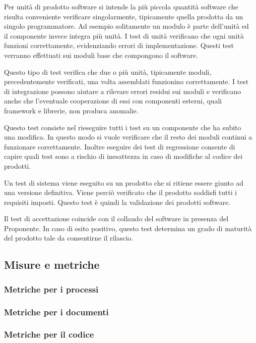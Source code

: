 Per unità di prodotto software si intende la più piccola quantità software che risulta conveniente verificare singolarmente, tipicamente quella prodotta da un singolo programmatore. Ad esempio solitamente un modulo è parte dell’unità ed il componente invece integra più unità. I test di unità verificano che ogni unità funzioni correttamente, evidenziando errori di implementazione. Questi test verranno effettuati sui moduli base che compongono il software.

Questo tipo di test verifica che due o più unità, tipicamente moduli, precedentemente verificati, una volta assemblati funzionino correttamente. I test di integrazione possono aiutare a rilevare errori residui sui moduli e verificano anche che l’eventuale cooperazione di essi con componenti esterni, quali framework e librerie, non produca anomalie.

Questo test consiste nel rieseguire tutti i test su un componente che ha subito una modifica. In questo modo si vuole verificare che il resto dei moduli continui a funzionare correttamente. Inoltre eseguire dei test di regressione consente di capire quali test sono a rischio di inesattezza in caso di modifiche al codice dei prodotti.

Un test di sistema viene eseguito su un prodotto che si ritiene essere giunto ad una versione definitiva. Viene perciò verificato che il prodotto soddisfi tutti i requisiti imposti. Questo test è quindi la validazione dei prodotti software.

Il test di accettazione coincide con il collaudo del software in presenza del Proponente. In caso di esito positivo, questo test determina un grado di maturità del prodotto tale da consentirne il rilascio.


\subsection{Misure e metriche}
\subsubsection{Metriche per i processi}

\subsubsection{Metriche per i documenti}

\subsubsection{Metriche per il codice}






